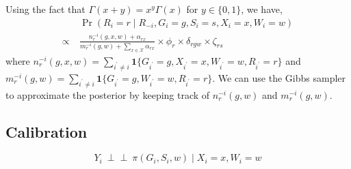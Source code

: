 \documentclass[11pt]{article}
\theoremstyle{plain}
\newcommand{\ind}{\mbox{$\perp\!\!\!\perp$}}
\newcommand\spacingset[1]{\renewcommand{\baselinestretch}%
  {#1}\small\normalsize}
\newcommand{\cX}{\mathcal{X}}
\begin{document}
Using the fact that $\Gamma(x+y)=x^y\Gamma(x)$ for $y \in \{0,1\}$, we
have,
\begin{align}
  & \Pr(R_i = r \mid R_{-i}, G_i = g, S_i = s, X_i = x, W_i = w) \\
  \propto \ &
              \frac{n_r^{-i}(g,x,w)+\alpha_{rx}}{m_r^{-i}(g,w)+\sum_{x
              \in \cX}\alpha_{rx}} \times \phi_r \times \delta_{rgw}
              \times \zeta_{rs}
\end{align}
where
$n_r^{-i}(g,x,w) = \sum_{i^\prime\ne i} \mathbf{1}\{G_{i^\prime} = g,
X_{i^\prime} = x, W_{i^\prime} = w, R_{i^\prime} = r\}$ and
$m_r^{-i}(g,w)=\sum_{i^\prime\ne i} \mathbf{1}\{G_{i^\prime} = g,
W_{i^\prime} = w, R_{i^\prime} = r\}$.  We can use the Gibbs sampler
to approximate the posterior by keeping track of $n_r^{-i}(g,w)$ and
$m_r^{-i}(g,w)$.

\subsection{Calibration}

\begin{equation}
  Y_i \ \ind \ \pi(G_i, S_i, w) \mid X_i = x, W_i = w
\end{equation}
    
\spacingset{1.5}

\end{document}
